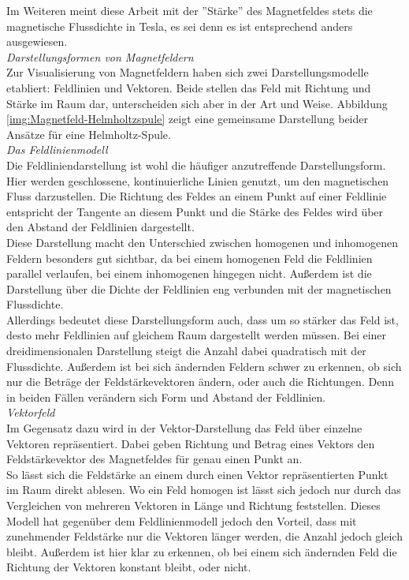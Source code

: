 Im Weiteren meint diese Arbeit mit der ''Stärke'' des Magnetfeldes stets die magnetische Flussdichte in Tesla, es sei denn es ist entsprechend anders ausgewiesen.\\

\vspace{4px}
\textit{Darstellungsformen von Magnetfeldern}\\
Zur Visualisierung von Magnetfeldern haben sich zwei Darstellungsmodelle etabliert: Feldlinien und Vektoren. Beide stellen das Feld mit Richtung und Stärke im Raum dar, unterscheiden sich aber in der Art und Weise. Abbildung \ref{img:Magnetfeld-Helmholtzspule} zeigt eine gemeinsame Darstellung beider Ansätze für eine Helmholtz-Spule.\\

\textit{Das Feldlinienmodell}\\
Die Feldliniendarstellung ist wohl die häufiger anzutreffende Darstellungsform. Hier werden geschlossene, kontinuierliche Linien genutzt, um den magnetischen Fluss darzustellen. Die Richtung des Feldes an einem Punkt auf einer Feldlinie entspricht der Tangente an diesem Punkt und die Stärke des Feldes wird über den Abstand der Feldlinien dargestellt.\\

Diese Darstellung macht den Unterschied zwischen homogenen und inhomogenen Feldern besonders gut sichtbar, da bei einem homogenen Feld die Feldlinien parallel verlaufen, bei einem inhomogenen hingegen nicht. Außerdem ist die Darstellung über die Dichte der Feldlinien eng verbunden mit der magnetischen Flussdichte.\\
Allerdings bedeutet diese Darstellungsform auch, dass um so stärker das Feld ist, desto mehr Feldlinien auf gleichem Raum dargestellt werden müssen. Bei einer dreidimensionalen Darstellung steigt die Anzahl dabei quadratisch mit der Flussdichte. Außerdem ist bei sich ändernden Feldern schwer zu erkennen, ob sich nur die Beträge der Feldstärkevektoren ändern, oder auch die Richtungen. Denn in beiden Fällen verändern sich Form und Abstand der Feldlinien.\\

\textit{Vektorfeld}\\
Im Gegensatz dazu wird in der Vektor-Darstellung das Feld über einzelne Vektoren repräsentiert. Dabei geben Richtung und Betrag eines Vektors den Feldstärkevektor des Magnetfeldes für genau einen Punkt an.\\
So lässt sich die Feldstärke an einem durch einen Vektor repräsentierten Punkt im Raum direkt ablesen. Wo ein Feld homogen ist lässt sich jedoch nur durch das Vergleichen von mehreren Vektoren in Länge und Richtung feststellen. Dieses Modell hat gegenüber dem Feldlinienmodell jedoch den Vorteil, dass mit zunehmender Feldstärke nur die Vektoren länger werden, die Anzahl jedoch gleich bleibt. Außerdem ist hier klar zu erkennen, ob bei einem sich ändernden Feld die Richtung der Vektoren konstant bleibt, oder nicht.

